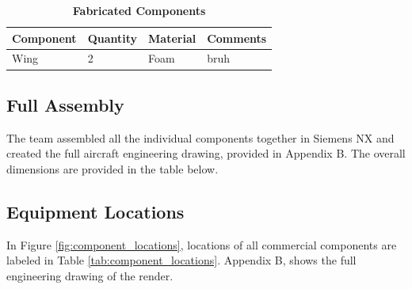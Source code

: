     
    
     \begin{table}[H]
         \begin{center}
         \caption{\textbf{Fabricated Components}} \label{table:fab_components}
         \begin{tabular}{|p{2in}|p{1in}|p{1in}|p{1in}|} %
             \hline \textbf{Component} & \textbf{Quantity} & \textbf{Material} & \textbf{Comments} \\ \hline %
             Wing & 2 & Foam & bruh \\ \hline
         \end{tabular}
         \end{center}
     \end{table}
    
    \subsection{Full Assembly}
    
    The team assembled all the individual components together in Siemens NX and created the full aircraft engineering drawing, provided in Appendix B. The overall dimensions are provided in the table below.
    
    
    \subsection{Equipment Locations}
    
        In Figure \ref{fig:component_locations}, locations of all commercial components are labeled in Table \ref{tab:component_locations}. Appendix B, shows the full engineering drawing of the render.
        
